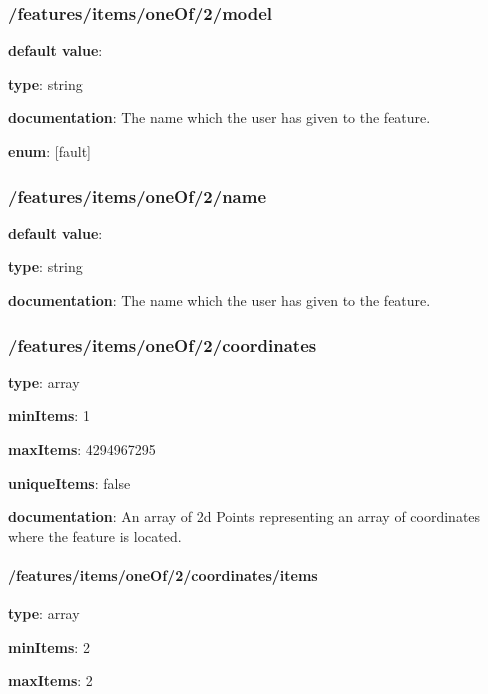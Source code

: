 \subsubsection{/features/items/oneOf/2/model} \begin{itemized}
\item {\bf default value}: 
\item {\bf type}: string
\item {\bf documentation}: The name which the user has given to the feature.
\item {\bf enum}: [fault]\end{itemized}\subsubsection{/features/items/oneOf/2/name} \begin{itemized}
\item {\bf default value}: 
\item {\bf type}: string
\item {\bf documentation}: The name which the user has given to the feature.
\end{itemized}\subsubsection{/features/items/oneOf/2/coordinates} \begin{itemized}
\item {\bf type}: array
\item {\bf minItems}: 1
\item {\bf maxItems}: 4294967295
\item {\bf uniqueItems}: false
\item {\bf documentation}: An array of 2d Points representing an array of coordinates where the feature is located.
\paragraph{/features/items/oneOf/2/coordinates/items} \begin{itemized}
\item {\bf type}: array
\item {\bf minItems}: 2
\item {\bf maxItems}: 2

\end{itemized}
\end{itemized}
